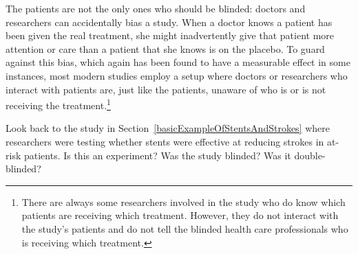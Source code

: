 The patients are not the only ones who should be blinded: doctors and researchers can accidentally bias a study. When a doctor knows a patient has been given the real treatment, she might inadvertently give that patient more attention or care than a patient that she knows is on the placebo. To guard against this bias, which again has been found to have a measurable effect in some instances, most modern studies employ a  setup where doctors or researchers who interact with patients are, just like the patients, unaware of who is or is not receiving the treatment.\footnote{There are always some researchers involved in the study who do know which patients are receiving which treatment. However, they do not interact with the study's patients and do not tell the blinded health care professionals who is receiving which treatment.}

\begin{exercisewrap}
\begin{nexercise}
Look back to the study in Section~\ref{basicExampleOfStentsAndStrokes} where researchers were testing whether stents were effective at reducing strokes in at-risk patients. Is this an experiment? Was the study blinded? Was it double-blinded?\footnotemark
\end{nexercise}
\end{exercisewrap}
